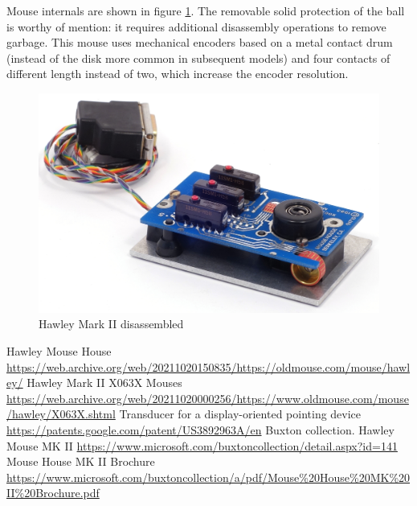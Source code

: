 \documentclass[11pt, a4paper]{article}
\begin{document}
Mouse internals are shown in figure \ref{fig:HawleyMarkIIInside}. The removable solid protection of the ball is worthy of mention: it requires additional disassembly operations to remove garbage. This mouse uses mechanical encoders  based on a metal contact drum (instead of the disk  more common in subsequent models) and four contacts of different length instead of two, which increase the encoder resolution.

 \begin{figure}[h]
    \centering
    \includegraphics[scale=0.8]{1983_hawley_mark_ii/inside_60.jpg}
    \caption{Hawley Mark II disassembled}
    \label{fig:HawleyMarkIIInside}
\end{figure}

\begin{thebibliography}{9}
 Hawley Mouse House \url{https://web.archive.org/web/20211020150835/https://oldmouse.com/mouse/hawley/}
 Hawley Mark II X063X Mouses \url{https://web.archive.org/web/20211020000256/https://www.oldmouse.com/mouse/hawley/X063X.shtml}
 Transducer for a display-oriented pointing device \url{https://patents.google.com/patent/US3892963A/en}
 Buxton collection. Hawley Mouse MK II \url{https://www.microsoft.com/buxtoncollection/detail.aspx?id=141}
 Mouse House MK II Brochure \url{https://www.microsoft.com/buxtoncollection/a/pdf/Mouse%20House%20MK%20II%20Brochure.pdf}
\end{thebibliography}
\end{document}
